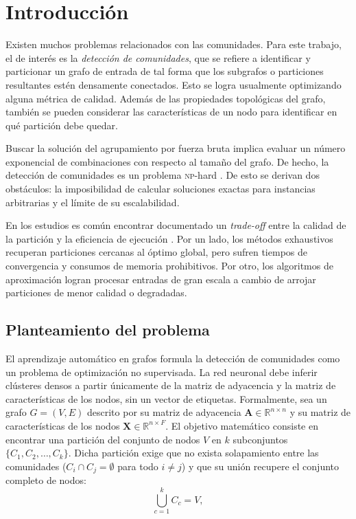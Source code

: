 \documentclass[twoside,twocolumn,10pt]{article}
\begin{document}
\section{Introducción}
\label{sec:introduccion}
\fontsize{10}{12}\selectfont

Existen muchos problemas relacionados con las comunidades. Para este trabajo, el de interés es la \textit{detección de comunidades}, que se refiere a identificar y particionar un grafo de entrada de tal forma que los subgrafos o particiones resultantes estén densamente conectados. Esto se logra usualmente optimizando alguna métrica de calidad. Además de las propiedades topológicas del grafo, también se pueden considerar las características de un nodo para identificar en qué partición debe quedar.

Buscar la solución del agrupamiento por fuerza bruta implica evaluar un número exponencial de combinaciones con respecto al tamaño del grafo. De hecho, la detección de comunidades es un problema \textsc{np}-hard \cite{tsitsulin2023}. De esto se derivan dos obstáculos: la imposibilidad de calcular soluciones exactas para instancias arbitrarias y el límite de su escalabilidad.

En los estudios es común encontrar documentado un \textit{trade-off} entre la calidad de la partición y la eficiencia de ejecución \cite{harenberg2014community}. Por un lado, los métodos exhaustivos recuperan particiones cercanas al óptimo global, pero sufren tiempos de convergencia y consumos de memoria prohibitivos. Por otro, los algoritmos de aproximación logran procesar entradas de gran escala a cambio de arrojar particiones de menor calidad o degradadas.

\subsection{Planteamiento del problema}

El aprendizaje automático en grafos formula la detección de comunidades como un problema de optimización no supervisada. La red neuronal debe inferir clústeres densos a partir únicamente de la matriz de adyacencia y la matriz de características de los nodos, sin un vector de etiquetas. Formalmente, sea un grafo $G=(V,E)$ descrito por su matriz de adyacencia $\mathbf{A} \in \mathbb{R}^{n \times n}$ y su matriz de características de los nodos $\mathbf{X} \in \mathbb{R}^{n \times F}$. El objetivo matemático consiste en encontrar una partición del conjunto de nodos $V$ en $k$ subconjuntos $\{C_1, C_2, \dots, C_k\}$. Dicha partición exige que no exista solapamiento entre las comunidades ($C_i \cap C_j = \emptyset$ para todo $i \neq j$) y que su unión recupere el conjunto completo de nodos:
\begin{equation}
\bigcup_{c=1}^{k} C_c = V, \label{eq:particion}
\end{equation}
\end{document}
